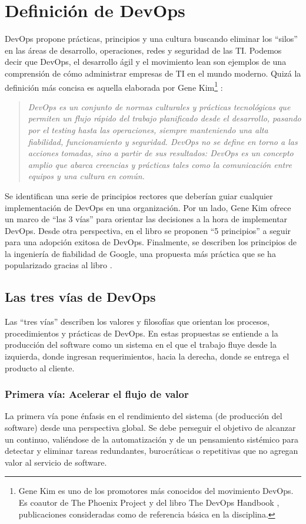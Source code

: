\section{Definición de DevOps}
%
DevOps propone prácticas, principios y una cultura buscando eliminar
los ``silos'' en las áreas de desarrollo, operaciones, redes y
seguridad de las TI. Podemos decir que DevOps, el desarrollo ágil y el
movimiento lean son ejemplos de una comprensión de cómo administrar
empresas de TI en el mundo moderno. Quizá la definición más concisa es
aquella elaborada por Gene Kim\footnote{ Gene Kim es uno de los
  promotores más conocidos del movimiento DevOps. Es coautor de The
  Phoenix Project \cite{phoenix} y del libro The DevOps Handbook
  \cite{handbook}, publicaciones consideradas como de referencia
  básica en la disciplina.} \cite{gruver}:
%
\begin{quote}
  \itshape
  DevOps es un conjunto de normas culturales y prácticas
  tecnológicas que permiten un flujo rápido del trabajo planificado
  desde el desarrollo, pasando por el testing hasta las operaciones,
  siempre manteniendo una alta fiabilidad, funcionamiento y
  seguridad. DevOps no se define en torno a las acciones tomadas, sino
  a partir de sus resultados: DevOps es un concepto amplio que abarca
  creencias y prácticas tales como la comunicación entre equipos y una
  cultura en común.
\end{quote}
%
Se identifican una serie de principios rectores que deberían guiar
cualquier implementación de DevOps en una organización. Por un lado,
Gene Kim ofrece un marco de ``las 3 vías'' \cite{3ways} para orientar
las decisiones a la hora de implementar DevOps. Desde otra
perspectiva, en el libro 
\cite{workbook} se proponen ``5 principios'' a seguir para una
adopción exitosa de DevOps. Finalmente, se describen los principios de
la ingeniería de fiabilidad de Google, una propuesta más práctica que
se ha popularizado gracias al libro {}
\cite{sre}.
%
\subsection{Las tres vías de DevOps}
%
Las ``tres vías'' describen los valores y filosofías que orientan los
procesos, procedimientos y prácticas de DevOps. En estas propuestas se
entiende a la producción del software como un sistema en el que el
trabajo fluye desde la izquierda, donde ingresan requerimientos, hacia
la derecha, donde se entrega el producto al cliente.
%
\subsubsection{Primera vía: Acelerar el flujo de valor }
%
La primera vía pone énfasis en el rendimiento del sistema (de
producción del software) desde una perspectiva global. Se debe
perseguir el objetivo de alcanzar un  continuo,
valiéndose de la automatización y de un pensamiento sistémico para
detectar y eliminar tareas redundantes, burocráticas o repetitivas que
no agregan valor al servicio de software.

